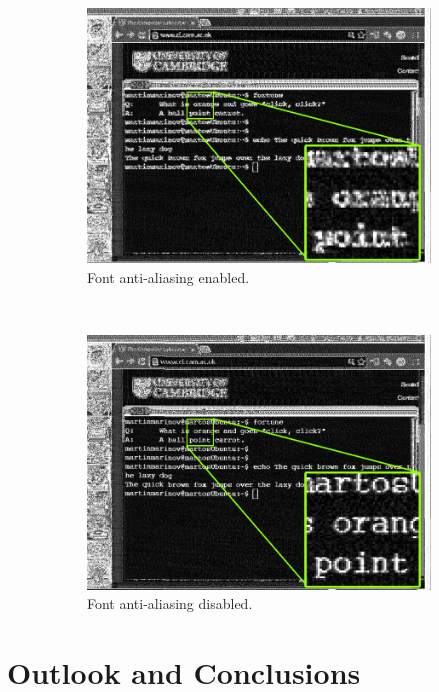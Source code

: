 \documentclass[a4paper,12pt,twoside,openright]{report}
\begin{document}
\begin{figure}[h!]
  \vspace{1cm}
  \begin{subfigure}[b]{0.45\textwidth}
  \includegraphics[width=\textwidth]{antialise_on}
  \caption{Font anti-aliasing enabled.}
\end{subfigure} ~
\begin{subfigure}[b]{0.45\textwidth}
  \includegraphics[width=\textwidth]{antialise_off}
  \caption{Font anti-aliasing disabled.}
\end{subfigure}
  \caption{}
  \label{fig:antialiseonoff}
\end{figure}

\chapter{Outlook and Conclusions} 
\label{chap:summary}
\end{document}
